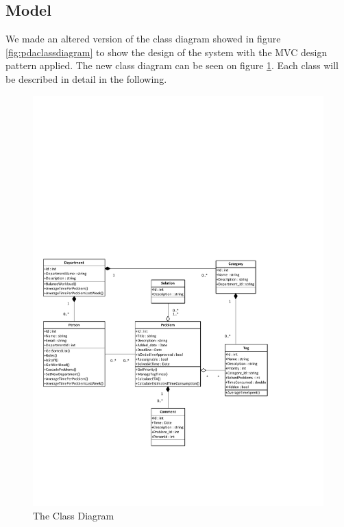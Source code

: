 \subsection{Model}
\label{sub:modelComponent}
We made an altered version of the class diagram showed in figure \ref{fig:pdaclassdiagram} to show the design of the system with the MVC design pattern applied. The new class diagram can be seen on figure \ref{fig:ClassDiagramV2}.
Each class will be described in detail in the following.
\begin{figure}[p]%
\includegraphics[scale=0.75]{input/component_design/ClassDiagramV2.pdf}%
\caption{The Class Diagram}%
\label{fig:ClassDiagramV2}%
\end{figure}

